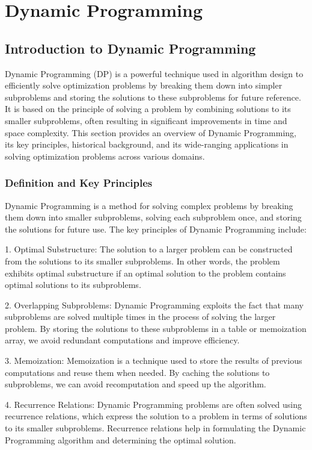 \documentclass[12pt]{book} %
\begin{document}
\chapter{Dynamic Programming}
\section{Introduction to Dynamic Programming}

Dynamic Programming (DP) is a powerful technique used in algorithm design to efficiently solve optimization problems by breaking them down into simpler subproblems and storing the solutions to these subproblems for future reference. It is based on the principle of solving a problem by combining solutions to its smaller subproblems, often resulting in significant improvements in time and space complexity. This section provides an overview of Dynamic Programming, its key principles, historical background, and its wide-ranging applications in solving optimization problems across various domains.

\subsection{Definition and Key Principles}

Dynamic Programming is a method for solving complex problems by breaking them down into smaller subproblems, solving each subproblem once, and storing the solutions for future use. The key principles of Dynamic Programming include:

1. Optimal Substructure: The solution to a larger problem can be constructed from the solutions to its smaller subproblems. In other words, the problem exhibits optimal substructure if an optimal solution to the problem contains optimal solutions to its subproblems.

2. Overlapping Subproblems: Dynamic Programming exploits the fact that many subproblems are solved multiple times in the process of solving the larger problem. By storing the solutions to these subproblems in a table or memoization array, we avoid redundant computations and improve efficiency.

3. Memoization: Memoization is a technique used to store the results of previous computations and reuse them when needed. By caching the solutions to subproblems, we can avoid recomputation and speed up the algorithm.

4. Recurrence Relations: Dynamic Programming problems are often solved using recurrence relations, which express the solution to a problem in terms of solutions to its smaller subproblems. Recurrence relations help in formulating the Dynamic Programming algorithm and determining the optimal solution.
\end{document}
